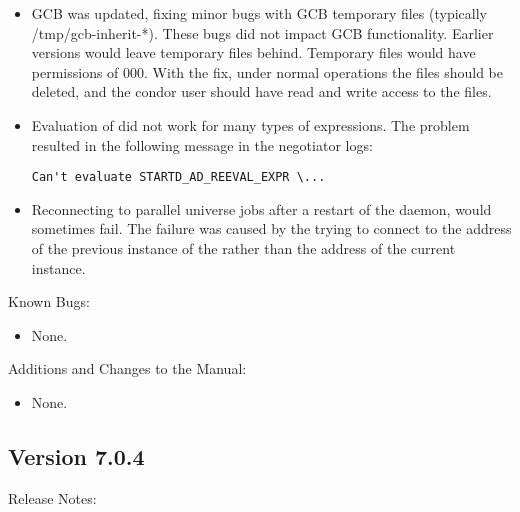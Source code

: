 \begin{itemize}
\item GCB was updated, fixing minor bugs with GCB temporary files (typically
/tmp/gcb-inherit-*).  These bugs did not impact GCB functionality.  Earlier
versions would leave temporary files behind. Temporary files would have
permissions of 000.  With the fix, under normal operations the files should be
deleted, and the condor user should have read and write access to the files.

\item Evaluation of  did not work for many
types of expressions.  The problem resulted in the following message in
the negotiator logs:

\begin{verbatim}
Can't evaluate STARTD_AD_REEVAL_EXPR \...
\end{verbatim}

\item Reconnecting to parallel universe jobs after a restart of the
 daemon, would sometimes fail.  The failure was caused
by the  trying to connect to the address of the
previous instance of the  rather than the address of
the current instance.

\end{itemize}

\noindent Known Bugs:

\begin{itemize}

\item None.

\end{itemize}

\noindent Additions and Changes to the Manual:

\begin{itemize}

\item None.

\end{itemize}


\subsection*{\label{sec:New-7-0-4}Version 7.0.4}

\noindent Release Notes:

